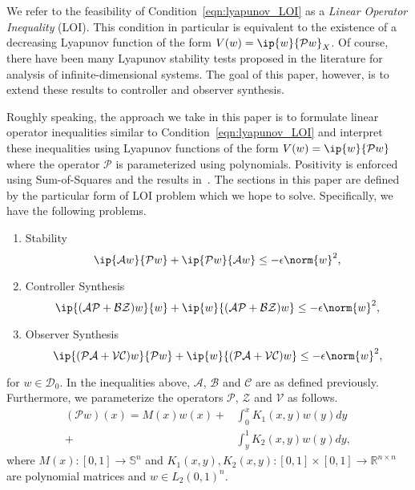 \documentclass[9pt,journal,twocolumn]{IEEEtran}
\newcommand{\lt}{L_2(0,1)}
\newcommand{\mcl}[1]{\mathcal{#1}}
\begin{document}
We refer to the feasibility of Condition~\eqref{eqn:lyapunov_LOI} as a \emph{Linear Operator Inequality} (LOI). This condition in particular is equivalent to the existence of a decreasing Lyapunov function of the form $V(w) = \ip{w}{\mathcal{P}w}_X$. Of course, there have been many Lyapunov stability tests proposed in the literature for analysis of infinite-dimensional systems. The goal of this paper, however, is to extend these results to controller and observer synthesis.

Roughly speaking, the approach we take in this paper is to formulate linear operator inequalities similar to Condition~\eqref{eqn:lyapunov_LOI} and interpret these inequalities using Lyapunov functions of the form $V(w) = \ip{w}{\mathcal{P}w}$ where the operator $\mathcal{P}$ is parameterized using polynomials. Positivity is enforced using Sum-of-Squares and the results in~\cite{peetlmi}. The sections in this paper are defined by the particular form of LOI problem which we hope to solve. Specifically, we have the following problems.
\begin{enumerate}
\item Stability
\[
\ip{\mathcal{A}w}{\mathcal{P}w}+\ip{\mathcal{P}w}{\mathcal{A}w} \le -\epsilon \norm{w}^2, 
\]
\item Controller Synthesis
\begin{equation}
\label{eqn:LOI_control}
\ip{(\mathcal{A}\mathcal{P}+\mathcal{B}\mathcal{Z}) w}{w}+\ip{w}{(\mathcal{A}\mathcal{P}+\mathcal{B}\mathcal{Z}) w} \le -\epsilon \norm{w}^2, 
\end{equation}
\item Observer Synthesis
\begin{equation}
\label{eqn:LOI_observer}
\ip{(\mathcal{P}\mathcal{A}+\mathcal{V}\mathcal{C})w}{\mathcal{P}w}+\ip{w}{(\mathcal{P}\mathcal{A}+\mathcal{V}\mathcal{C}) w} \le -\epsilon \norm{w}^2, 
\end{equation}
\end{enumerate} for $w \in \mcl{D}_0$.
In the inequalities above, $\mcl{A}$, $\mcl{B}$ and $\mathcal{C}$ are as defined previously.
Furthermore, we parameterize the operators $\mathcal{P}$, $\mathcal{Z}$ and $\mathcal{V}$ as follows.
\begin{align}
(\mathcal{P}w)(x)=M(x)w(x) +  &\int_0^x K_1(x,y) w(y) d y \nonumber \\
 +  &\label{eqn:operator}\int_y^1 K_2(x,y) w(y) d y, 
\end{align}
where $M(x):[0,1] \rightarrow \mathbb{S}^n$ and $K_1(x,y),K_2(x,y): [0,1] \times [0,1] \rightarrow \mathbb{R}^{n \times n}$ are polynomial matrices and $w \in \lt^n$.
\end{document}
